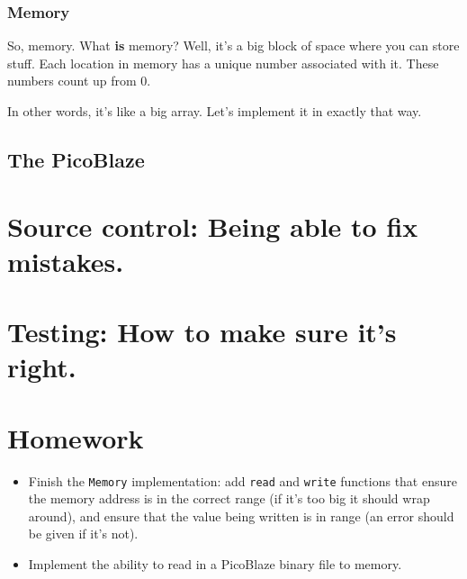 \documentclass[12pt,a4paper]{article}
\begin{document}


\pagebreak
\subsubsection{Memory}

So, memory. What \textbf{is} memory? Well, it's a big block of space
where you can store stuff. Each location in memory has a unique number
associated with it. These numbers count up from 0.

In other words, it's like a big array. Let's implement it in exactly
that way.



\pagebreak
\subsection{The PicoBlaze}

\pagebreak
\section{Source control: Being able to fix mistakes.}

\pagebreak
\section{Testing: How to make sure it's right.}

\pagebreak
\section{Homework}

\begin{itemize}
  \item Finish the \texttt{Memory} implementation: add \texttt{read}
    and \texttt{write} functions that ensure the memory address is in
    the correct range (if it's too big it should wrap around), and
    ensure that the value being written is in range (an error should
    be given if it's not).

  \item Implement the ability to read in a PicoBlaze binary file to
    memory.
\end{itemize}
\end{document}

